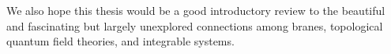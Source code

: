 We also hope this thesis would be a good introductory review to the beautiful
and fascinating but largely unexplored connections among branes, topological
quantum field theories, and integrable systems.



















